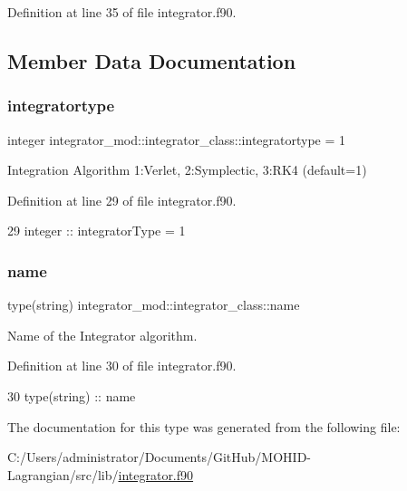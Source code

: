 Definition at line 35 of file integrator.\+f90.



\subsection{Member Data Documentation}
\mbox{\label{structintegrator__mod_1_1integrator__class_a806db7072f1822bd3b10b3f8ae83c33a}} 
\subsubsection{\texorpdfstring{integratortype}{integratortype}}
{\footnotesize\ttfamily integer integrator\+\_\+mod\+::integrator\+\_\+class\+::integratortype = 1\hspace{0.3cm}{\ttfamily [private]}}



Integration Algorithm 1\+:Verlet, 2\+:Symplectic, 3\+:R\+K4 (default=1) 



Definition at line 29 of file integrator.\+f90.


\begin{DoxyCode}
29         \textcolor{keywordtype}{integer} :: integratorType = 1
\end{DoxyCode}
\mbox{\label{structintegrator__mod_1_1integrator__class_a5f8a28319eb6f1558ee1d320cdf90cf6}} 
\subsubsection{\texorpdfstring{name}{name}}
{\footnotesize\ttfamily type(string) integrator\+\_\+mod\+::integrator\+\_\+class\+::name\hspace{0.3cm}{\ttfamily [private]}}



Name of the Integrator algorithm. 



Definition at line 30 of file integrator.\+f90.


\begin{DoxyCode}
30         \textcolor{keywordtype}{type}(string) :: name
\end{DoxyCode}


The documentation for this type was generated from the following file\+:\begin{DoxyCompactItemize}
\item 
C\+:/\+Users/administrator/\+Documents/\+Git\+Hub/\+M\+O\+H\+I\+D-\/\+Lagrangian/src/lib/\mbox{\hyperlink{integrator_8f90}{integrator.\+f90}}\end{DoxyCompactItemize}
